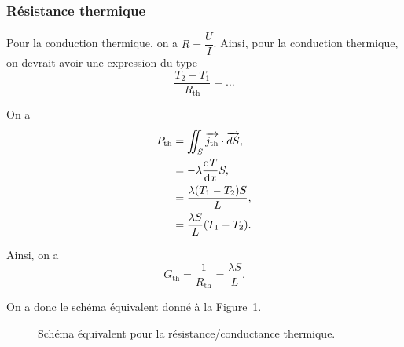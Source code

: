         \subsubsection{Résistance thermique}

            Pour la conduction thermique, on a $R=\dfrac{U}{I}$. Ainsi, pour la conduction thermique, on devrait avoir une expression du type
            \begin{equation*}
                \frac{T_2-T_1}{R_{\text{th}}}=\dots
            \end{equation*}

            On a 
            \begin{align*}
                P_{\text{th}}
                &=\iint_{S}\protect\overrightarrow{{j_\text{th}}}\cdot\protect\overrightarrow{{dS}},\\
                &=
                -\lambda\frac{\mathrm{d} T}{\mathrm{d} x}S,\\
                &=
                \frac{\lambda(T_1-T_2)S}{L},\\
                &=\frac{\lambda S}{L}(T_1-T_2).
            \end{align*}

            Ainsi, on a 
            \begin{equation*}
                \boxed{
                    G_{\text{th}}=\frac{1}{R_{\text{th}}}=\frac{\lambda S}{L}.
                }
            \end{equation*}

            On a donc le schéma équivalent donné à la Figure~\ref{fig:schema_equivalent_resistance_conductance_thermique}.
            \begin{figure}
                \centering
                \caption{Schéma équivalent pour la résistance/conductance thermique.}    
                \label{fig:schema_equivalent_resistance_conductance_thermique}
            \end{figure}

